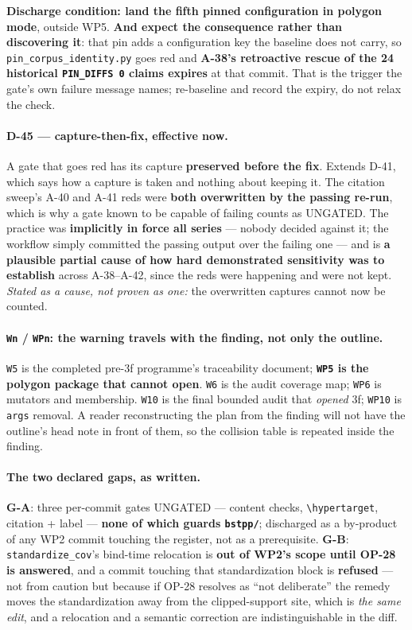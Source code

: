 \documentclass[
  10pt,
]{article}
\begin{document}
\textbf{Discharge condition: land the fifth pinned configuration in polygon mode}, outside WP5. \textbf{And expect the consequence rather than discovering it}: that pin adds a configuration key the baseline does not carry, so \texttt{pin\_corpus\_identity.py} goes red and \textbf{A-38's retroactive rescue of the 24 historical \texttt{PIN\_DIFFS 0} claims expires} at that commit. That is the trigger the gate's own failure message names; re-baseline and record the expiry, do not relax the check.

\paragraph{D-45 --- capture-then-fix, effective now.}
A gate that goes red has its capture \textbf{preserved before the fix}. Extends D-41, which says how a capture is taken and nothing about keeping it. The citation sweep's A-40 and A-41 reds were \textbf{both overwritten by the passing re-run}, which is why a gate known to be capable of failing counts as UNGATED. The practice was \textbf{implicitly in force all series} --- nobody decided against it; the workflow simply committed the passing output over the failing one --- and is \textbf{a plausible partial cause of how hard demonstrated sensitivity was to establish} across A-38--A-42, since the reds were happening and were not kept. \emph{Stated as a cause, not proven as one:} the overwritten captures cannot now be counted.

\paragraph{\texttt{Wn} / \texttt{WPn}: the warning travels with the finding, not only the outline.}
\texttt{W5} is the completed pre-3f programme's traceability document; \textbf{\texttt{WP5} is the polygon package that cannot open}. \texttt{W6} is the audit coverage map; \texttt{WP6} is mutators and membership. \texttt{W10} is the final bounded audit that \emph{opened} 3f; \texttt{WP10} is \texttt{args} removal. A reader reconstructing the plan from the finding will not have the outline's head note in front of them, so the collision table is repeated inside the finding.

\paragraph{The two declared gaps, as written.}
\textbf{G-A}: three per-commit gates UNGATED --- content checks, \texttt{\textbackslash hypertarget}, citation + label --- \textbf{none of which guards \texttt{bstpp/}}; discharged as a by-product of any WP2 commit touching the register, not as a prerequisite. \textbf{G-B}: \texttt{standardize\_cov}'s bind-time relocation is \textbf{out of WP2's scope until OP-28 is answered}, and a commit touching that standardization block is \textbf{refused} --- not from caution but because if OP-28 resolves as ``not deliberate'' the remedy moves the standardization away from the clipped-support site, which is \emph{the same edit}, and a relocation and a semantic correction are indistinguishable in the diff.
\end{document}
